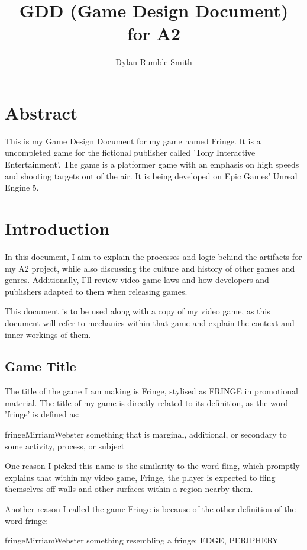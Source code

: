 \documentclass[12pt]{article}
\title{GDD (Game Design Document) for A2}
\author{Dylan Rumble-Smith}
\begin{document}
	{\setlength{\parskip}{0pt}%
		\maketitle
		
		\section*{\centering Abstract}
		\begin{adjustwidth}{90pt}{90pt}
			This is my Game Design Document for my game named Fringe. It is a uncompleted game for the fictional publisher called 'Tony Interactive Entertainment'. The game is a platformer game with an emphasis on high speeds and shooting targets out of the air. It is being developed on Epic Games' Unreal Engine 5.
		\end{adjustwidth}
		\pagebreak
		\tableofcontents
		\pagebreak
		}
	
	\section{Introduction}
	In this document, I aim to explain the processes and logic behind the artifacts for my A2 project, while also discussing the culture and history of other games and genres. Additionally, I'll review video game laws and how developers and publishers adapted to them when releasing games.
	
	This document is to be used along with a copy of my video game, as this document will refer to mechanics within that game and explain the context and inner-workings of them.
	\subsection{Game Title}
	The title of the game I am making is Fringe, stylised as FRINGE in promotional material. The title of my game is directly related to its definition, as the word 'fringe' is defined as:
	\begin{displaycquote}{fringeMirriamWebster}
		something that is marginal, additional, or secondary to some activity, process, or subject
	\end{displaycquote}
	
	One reason I picked this name is the similarity to the word fling, which promptly explains that within my video game, Fringe, the player is expected to fling themselves off walls and other surfaces within a region nearby them.
	
	Another reason I called the game Fringe is because of the other definition of the word fringe:
	\begin{displaycquote}{fringeMirriamWebster}
		something resembling a fringe: EDGE, PERIPHERY
	\end{displaycquote}
	
\end{document}
